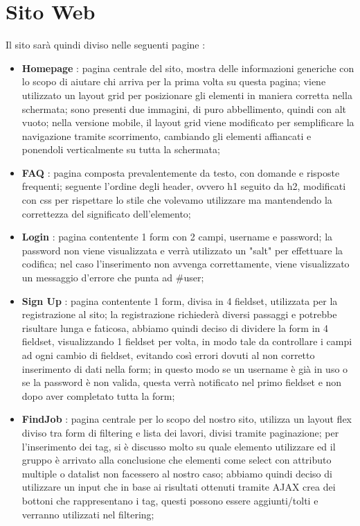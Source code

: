 \section{Sito Web}
	Il sito sarà quindi diviso nelle seguenti pagine :
  \begin{itemize}
    \item \textbf{Homepage} : pagina centrale del sito, mostra delle informazioni generiche con lo scopo di aiutare chi arriva per la prima volta su questa pagina;
    viene utilizzato un layout grid per posizionare gli elementi in maniera corretta nella schermata; sono presenti due immagini, di puro abbellimento, quindi con alt vuoto;
    nella versione mobile, il layout grid viene modificato per semplificare la navigazione tramite scorrimento, cambiando gli elementi affiancati e ponendoli verticalmente su tutta la schermata;
    \item \textbf{FAQ} : pagina composta prevalentemente da testo, con domande e risposte frequenti; seguente l'ordine degli header, ovvero h1 seguito da h2, modificati con css per rispettare lo stile che volevamo utilizzare ma mantendendo la correttezza del significato dell'elemento;
    \item \textbf{Login} : pagina contentente 1 form con 2 campi, username e password; la password non viene visualizzata e verrà utilizzato un "salt" per effettuare la codifica; nel caso l'inserimento non avvenga correttamente, viene visualizzato un messaggio d'errore che punta ad \#user;
    \item \textbf{Sign Up} : pagina contentente 1 form, divisa in 4 fieldset, utilizzata per la registrazione al sito;
    la registrazione richiederà diversi passaggi e potrebbe risultare lunga e faticosa, abbiamo quindi deciso di dividere la form in 4 fieldset, visualizzando 1 fieldset
    per volta, in modo tale da controllare i campi ad ogni cambio di fieldset, evitando così errori dovuti al non corretto inserimento di dati nella form; in questo modo se un username è già in uso o se la password è non valida, questa verrà notificato nel primo fieldset e non dopo aver completato tutta la form;
    \item \textbf{FindJob} : pagina centrale per lo scopo del nostro sito, utilizza un layout flex diviso tra form di filtering e lista dei lavori, divisi tramite paginazione;
    per l'inserimento dei tag, si è discusso molto su quale elemento utilizzare ed il gruppo è arrivato alla conclusione che elementi come select con attributo multiple o datalist non facessero al nostro caso;
    abbiamo quindi deciso di utilizzare un input che in base ai risultati ottenuti tramite AJAX crea dei bottoni che rappresentano i tag, questi possono essere aggiunti/tolti e verranno utilizzati nel filtering;

\end{itemize}
